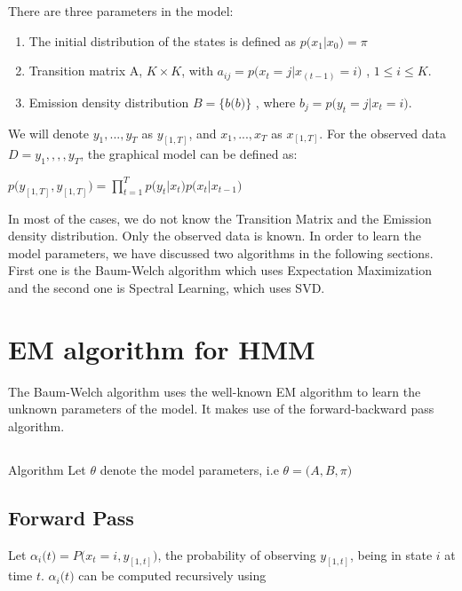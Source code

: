 \documentclass{article} %
\begin{document}
There are three parameters in the model:
\begin{enumerate}
\item The initial distribution of the states is defined as \(p\big(x_1|x_0 \big) = \pi\)
\item Transition matrix A, \(K \times K \), with \(a_{ij} = p\big(x_t=j|x_(t-1)=i\big)\) , \(1\leq i \leq K \).
\item Emission density distribution \(B = \{b\big( b\big)\}\) , where \(b_{j} = p\big(y_t=j|x_t=i\big)\).
\end{enumerate}

We will denote \(y_1,...,y_T\) as \(y_{[1,T]}\), and \(x_1,...,x_T\) as \(x_{[1,T]}\). For the observed data \(D ={y_1,,,,y_T}\), the graphical model can be defined as:

\begin{center} \(  p\big( y_{[1,T]}, y_{[1,T]} \big) = \prod_{t=1}^{T}p\big(y_t|x_t\big)p\big(x_t|x_{t-1}\big)  \)
\end{center}

In most of the cases, we do not know the Transition Matrix and the Emission density distribution. Only
the observed data is known. In order to learn the model parameters, we have discussed two algorithms in the following sections. First one is the Baum-Welch algorithm which uses Expectation Maximization and the second one is Spectral Learning, which uses SVD.

\section{EM algorithm for HMM}
\label{EM algorithm}
The Baum-Welch algorithm uses the well-known EM algorithm to learn the unknown parameters of the model. It makes use of the forward-backward pass algorithm. 

\subsection*{}{Algorithm}
Let $\theta$ denote the model parameters, i.e \( \theta = \big(A,B,\pi\big) \)

\subsection*{Forward Pass}
Let $\alpha_i\big(t\big) = P\big(x_t=i, y_{[1,t]}\big)$, the probability of observing  $y_{[1,t]}$, being in state $i$ at time $t$. $\alpha_i\big(t\big)$ can be computed recursively using 
\end{document}
